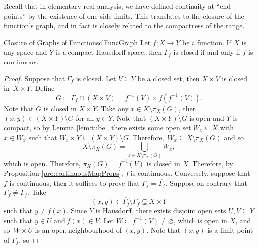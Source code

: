 \documentclass[math]{amznotes}
\theoremstyle{remark}
\begin{document}
Recall that in elementary real analysis, we have defined continuity at ``end points'' by the existence of one-side limits. This translates to the closure of the function's graph, and in fact is closely related to the compactness of the range.
\begin{probox}{Closure of Graphs of Functions}{clFuncGraph}
    Let $f \colon X \to Y$ be a function. If $X$ is any space and $Y$ is a compact Hausdorff space, then $\Gamma_f$ is closed if and only if $f$ is continuous.
    \tcblower
    \begin{proof}
        Suppose that $\Gamma_f$ is closed. Let $V \subseteq Y$ be a closed set, then $X \times V$ is closed in~$X \times Y$. Define 
        \begin{equation*}
            G \coloneqq \Gamma_f \cap \left(X \times V\right) = f^{-1}\left(V\right) \times f\left(f^{-1}\left(V\right)\right).
        \end{equation*}
        Note that $G$ is closed in $X \times Y$. Take any $x \in X \setminus \pi_X\left(G\right)$, then $\left(x, y\right) \in \left(X \times Y\right) \setminus G$ for all $y \in Y$. Note that $\left(X \times Y\right) \setminus G$ is open and $Y$ is compact, so by Lemma \ref{lem:tube}, there exists some open set $W_x \subseteq X$ with $x \in W_x$ such that $W_x \times Y \subseteq \left(X \times Y\right) \setminus G$. Therefore,~$W_x \subseteq X \setminus \pi_X\left(G\right)$ and so 
        \begin{equation*}
            X \setminus \pi_X\left(G\right) = \bigcup_{x \in X \setminus \pi_X\left(G\right)}W_x,
        \end{equation*}
        which is open. Therefore, $\pi_X\left(G\right) = f^{-1}\left(V\right)$ is closed in $X$. Therefore, by Proposition \ref{pro:continuousMapProps}, $f$ is continuous. Conversely, suppose that $f$ is continuous, then it suffices to prove that $\Gamma_f = \overline{\Gamma_f}$. Suppose on contrary that $\Gamma_f \neq \overline{\Gamma_f}$. Take
        \begin{equation*}
            \left(x, y\right) \in \overline{\Gamma_f} \setminus \Gamma_f \subseteq X \times Y
        \end{equation*}
        such that $y \neq f\left(x\right)$. Since $Y$ is Hausdorff, there exists disjoint open sets $U, V \subseteq Y$ such that $y \in U$ and $f\left(x\right) \in V$. Let $W \coloneqq f^{-1}\left(V\right) \neq \varnothing$, which is open in $X$, and so~$W \times U$ is an open neighbourhood of $\left(x, y\right)$. Note that $\left(x, y\right)$ is a limit point of $\Gamma_f$, so

\end{proof}
\end{probox}
\end{document}
